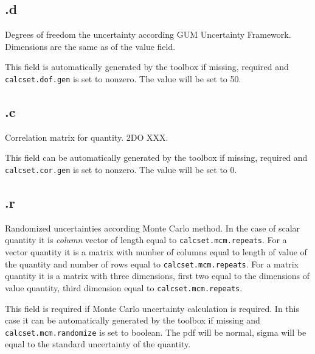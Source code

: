 \documentclass[12pt]{article} %
\begin{document}
\subsection{\textsf{.d}} %
Degrees of freedom the uncertainty according GUM Uncertainty Framework. Dimensions are the same as of the value field.

This field is automatically generated by the toolbox if missing, required and \lstinline{calcset.dof.gen}
is set to nonzero. The value will be set to 50.

\subsection{\textsf{.c}} %
Correlation matrix for quantity. 2DO XXX.

This field can be automatically generated by the toolbox if missing, required and \lstinline{calcset.cor.gen}
is set to nonzero. The value will be set to 0.

\subsection{\textsf{.r}} %
Randomized uncertainties according Monte Carlo method. In the case of scalar quantity it is
\emph{column} vector of length equal to \lstinline{calcset.mcm.repeats}. For a vector quantity it is a matrix with number
of columns equal to length of value of the quantity and number of rows equal to
\lstinline{calcset.mcm.repeats}. For a matrix quantity it is a matrix with three dimensions, first
two equal to the dimensions of value quantity, third dimension equal to
\lstinline{calcset.mcm.repeats}.

This field is required if Monte Carlo uncertainty calculation is required. In this case it can be
automatically generated by the toolbox if missing and \lstinline{calcset.mcm.randomize} is set to
boolean. The pdf will be normal, sigma will be equal to the standard uncertainty of the quantity.
\end{document}

